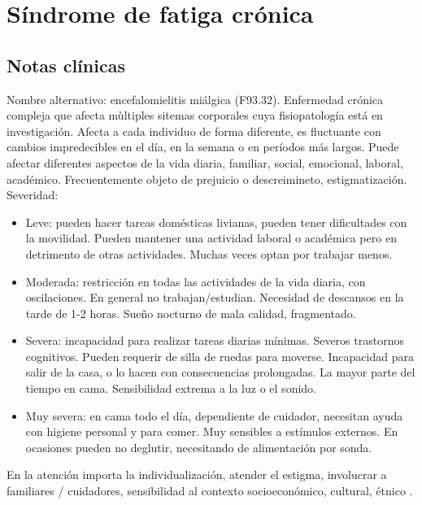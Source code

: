 \chapter{Síndrome de fatiga crónica}
\section*{Notas clínicas}
Nombre alternativo: encefalomielitis miálgica (F93.32).
Enfermedad crónica compleja que afecta mùltiples sitemas corporales cuya fisiopatología está en investigación. Afecta a cada individuo de forma diferente, es fluctuante con cambios impredecibles en el día, en la semana o en períodos más largos. Puede afectar diferentes aspectos de la vida diaria, familiar, social, emocional, laboral, académico.
Frecuentemente objeto de prejuicio o descreimineto, estigmatización.
Severidad:
\begin{itemize}
	\item Leve: pueden hacer tareas domésticas livianas, pueden tener dificultades con la movilidad. Pueden mantener una actividad laboral o académica pero en detrimento de otras actividades. Muchas veces optan por trabajar menos.
	\item Moderada: restricción en todas las actividades de la vida diaria, con oscilaciones. En general no trabajan/estudian. Necesidad de descansos en la tarde de 1-2 horas. Sueño nocturno de mala calidad, fragmentado.
	\item Severa: incapacidad para realizar tareas diarias mínimas. Severos trastornos cognitivos. Pueden requerir de silla de ruedas para moverse. Incapacidad para salir de la casa, o lo hacen con consecuencias prolongadas. La mayor parte del tiempo en cama. Sensibilidad extrema a la luz o el sonido.
	\item Muy severa: en cama todo el día, dependiente de cuidador, necesitan ayuda con higiene personal y para comer. Muy sensibles a estímulos externos. En ocasiones pueden no deglutir, necesitando de alimentación por sonda.
\end{itemize}
En la atención importa la individualización, atender el estigma, involucrar a familiares / cuidadores, sensibilidad al contexto socioeconómico, cultural, étnico \cite{baker2007diagnosis}.
